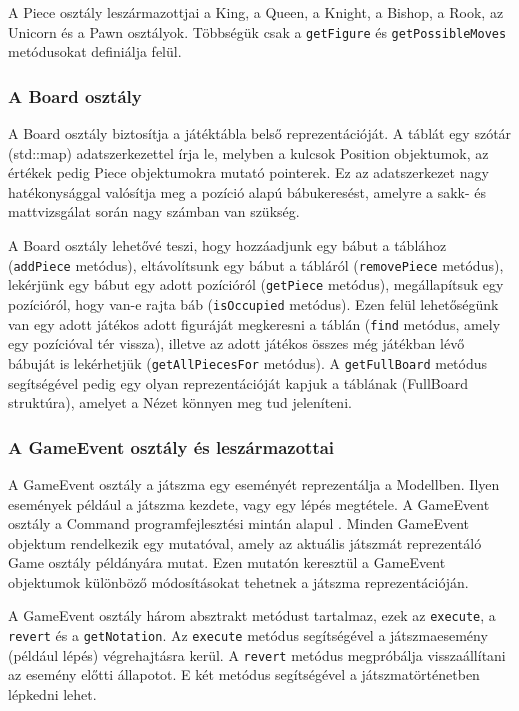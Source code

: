 \documentclass[12pt, twoside]{report}
\begin{document}
A Piece osztály leszármazottjai a King, a Queen, a Knight, a Bishop, a Rook, az Unicorn és a Pawn osztályok. Többségük csak a {\tt getFigure} és {\tt getPossibleMoves} metódusokat definiálja felül.

\subsubsection{A Board osztály}

A Board osztály biztosítja a játéktábla belső reprezentációját. A táblát egy szótár (std::map) adatszerkezettel írja le, melyben a kulcsok Position objektumok, az értékek pedig Piece objektumokra mutató pointerek. Ez az adatszerkezet nagy hatékonysággal valósítja meg a pozíció alapú bábukeresést, amelyre a sakk- és mattvizsgálat során nagy számban van szükség.

A Board osztály lehetővé teszi, hogy hozzáadjunk egy bábut a táblához ({\tt addPiece} metódus), eltávolítsunk egy bábut a tábláról ({\tt removePiece} metódus), lekérjünk egy bábut egy adott pozícióról ({\tt getPiece} metódus), megállapítsuk egy pozícióról, hogy van-e rajta báb ({\tt isOccupied} metódus). Ezen felül lehetőségünk van egy adott játékos adott figuráját megkeresni a táblán ({\tt find} metódus, amely egy pozícióval tér vissza), illetve az adott játékos összes még játékban lévő bábuját is lekérhetjük ({\tt getAllPiecesFor} metódus). A {\tt getFullBoard} metódus segítségével pedig egy olyan reprezentációját kapjuk a táblának (FullBoard struktúra), amelyet a Nézet könnyen meg tud jeleníteni.

\subsubsection{A GameEvent osztály és leszármazottai}

A GameEvent osztály a játszma egy eseményét reprezentálja a Modellben. Ilyen események például a játszma kezdete, vagy egy lépés megtétele. A GameEvent osztály a Command programfejlesztési mintán alapul \cite[233]{designpatterns}. Minden GameEvent objektum rendelkezik egy mutatóval, amely az aktuális játszmát reprezentáló Game osztály példányára mutat. Ezen mutatón keresztül a GameEvent objektumok különböző módosításokat tehetnek a játszma reprezentációján.

A GameEvent osztály három absztrakt metódust tartalmaz, ezek az {\tt execute}, a {\tt revert} és a {\tt getNotation}. Az {\tt execute} metódus segítségével a játszmaesemény (például lépés) végrehajtásra kerül. A {\tt revert} metódus megpróbálja visszaállítani az esemény előtti állapotot. E két metódus segítségével a játsz\-ma\-tör\-té\-net\-ben lépkedni lehet.
\end{document}
